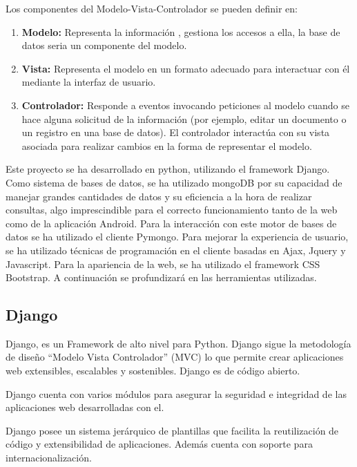 \documentclass[a4paper,11pt]{book}
\begin{document}
Los componentes\cite{mvc3}\cite{mvc4} del Modelo-Vista-Controlador se pueden definir en:

\begin{enumerate}
\item \textbf{Modelo:} Representa la información , gestiona los accesos a ella, la base de datos seria un componente del modelo. 

\item \textbf{Vista:} Representa el modelo en un formato adecuado para interactuar con él mediante la interfaz de usuario.  

\item \textbf{Controlador:} Responde a eventos invocando peticiones al modelo cuando se hace alguna solicitud de la información (por ejemplo, editar un documento o un registro en una base de datos). El controlador interactúa con su vista asociada para realizar cambios en la forma de representar el modelo. 
\end{enumerate}

Este proyecto se ha desarrollado en python, utilizando el framework Django. Como sistema de bases de datos, se ha utilizado mongoDB por su capacidad de manejar grandes cantidades de datos y su eficiencia a la hora de realizar consultas, algo imprescindible para el correcto funcionamiento tanto de la web como de la aplicación Android. Para la interacción con este motor de bases de datos se ha utilizado el cliente Pymongo. Para mejorar la experiencia de usuario, se ha utilizado técnicas de programación en el cliente basadas en Ajax, Jquery y Javascript. Para la apariencia de la web, se ha utilizado el framework CSS Bootstrap. A continuación se profundizará en las herramientas utilizadas. 

 



\subsection{Django}
Django\cite{dj}, es un Framework de alto nivel para Python. Django sigue la metodología de diseño “Modelo Vista Controlador” (MVC) lo que permite crear aplicaciones web extensibles, escalables y sostenibles. Django es de código abierto. 

Django cuenta con varios módulos para asegurar la seguridad e integridad de las aplicaciones web desarrolladas con el. 

Django posee un sistema jerárquico de plantillas que facilita la reutilización de código y extensibilidad de aplicaciones. Además cuenta con soporte para internacionalización.
\end{document}
